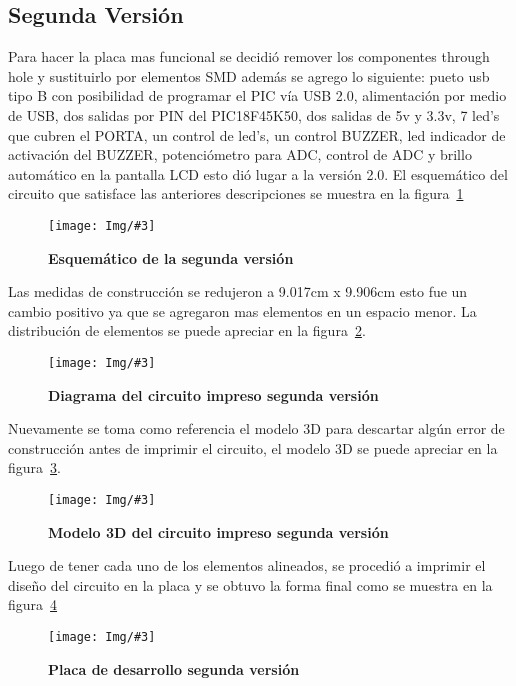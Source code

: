 \documentclass[times, 10pt,twocolumn]{article}
\newcommand{\Img}[5]{
   \begin{figure}[H]
   	   \centering
       \texttt{[image: Img/\#3]}
       \caption{ \centering \textbf{\small #4}}
       \label{#5}
       \end{figure}
   }
\begin{document}
\subsection{Segunda Versión}
Para hacer la placa mas funcional se decidió remover los componentes through hole y sustituirlo por elementos SMD además se agrego lo siguiente: pueto usb tipo B con posibilidad de programar el PIC vía USB 2.0, alimentación por medio de USB, dos salidas por PIN del PIC18F45K50, dos salidas de 5v y 3.3v, 7 led's que cubren el PORTA, un control de led's,
un control BUZZER, led indicador de activación del BUZZER,  potenciómetro para ADC, control de ADC y brillo automático en la pantalla LCD esto dió lugar a la versión 2.0.
El esquemático del circuito que satisface las anteriores descripciones se muestra en la figura~\ref{fig:5}
\Img{8.0cm}{5.5cm}{Segunda_Version}{Esquemático de la segunda versión}{fig:5}
Las medidas de construcción se redujeron a 9.017cm x 9.906cm esto fue un cambio positivo ya que se agregaron mas elementos en un espacio menor. La distribución de elementos se puede apreciar en la figura~\ref{fig:6}. 
\Img{6.5cm}{6.0cm}{segunda_version_pcb}{Diagrama del circuito impreso segunda versión}{fig:6}
Nuevamente se toma como referencia el modelo 3D para descartar algún error de construcción antes de imprimir el circuito, el modelo 3D se puede apreciar en la figura~\ref{fig:7}.
\Img{7.5cm}{6.2cm}{segunda_version_3d}{Modelo 3D del circuito impreso segunda versión}{fig:7}
Luego de tener cada uno de los elementos alineados, se procedió a imprimir el diseño del circuito en la placa y se obtuvo la forma final como se muestra en la figura~\ref{fig:8}
\Img{7.5cm}{7.0cm}{segunda_version_final}{Placa de desarrollo segunda versión}{fig:8}


\end{document}
